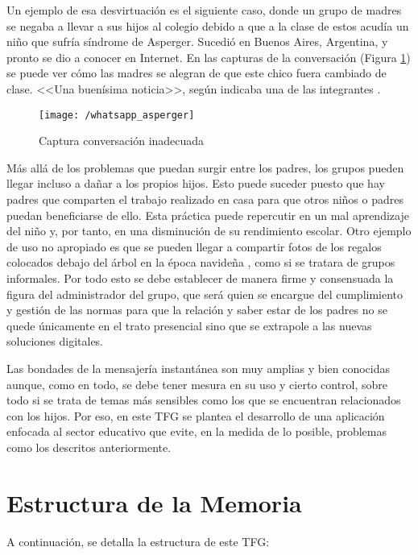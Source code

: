 \newpage

Un ejemplo de esa desvirtuación es el siguiente caso, donde un grupo de madres se negaba a llevar a sus hijos al colegio debido a que a la clase de estos acudía un niño que sufría síndrome de Asperger. Sucedió en Buenos Aires, Argentina, y pronto se dio a conocer en Internet.
En las capturas de la conversación (Figura \ref{fig:whatasper}) se puede ver cómo las madres se alegran de que este chico fuera cambiado de clase. <<Una buenísima noticia>>, según indicaba una de las integrantes \cite{Vanguardia2017}.

\begin{figure}[!h]
	\begin{center}
		\texttt{[image: /whatsapp\_asperger]}
		\caption{Captura conversación inadecuada}
		\label{fig:whatasper}
	\end{center}
\end{figure}

Más allá de los problemas que puedan surgir entre los padres, los grupos pueden llegar incluso a dañar a los propios hijos. Esto puede suceder puesto que hay padres que comparten el trabajo realizado en casa para que otros niños o padres puedan beneficiarse de ello. Esta práctica puede repercutir en un mal aprendizaje del niño y, por tanto, en una disminución de su rendimiento escolar. Otro ejemplo de uso no apropiado es que se pueden llegar a compartir fotos de los regalos colocados debajo del árbol en la época navideña \cite{Alias2017}, como si se tratara de grupos informales. Por todo esto se debe establecer de manera firme y consensuada la figura del administrador del grupo, que será quien se encargue del cumplimiento y gestión de las normas para que la relación y saber estar de los padres no se quede únicamente en el trato presencial sino que se extrapole a las nuevas soluciones digitales.

\newpage

Las bondades de la mensajería instantánea son muy amplias y bien conocidas aunque, como en todo, se debe tener mesura en su uso y cierto control, sobre todo si se trata de temas más sensibles como los que se encuentran relacionados con los hijos. Por eso, en este \acs{TFG} se plantea el desarrollo de una aplicación enfocada al sector educativo que evite, en la medida de lo posible, problemas como los descritos anteriormente.

\section{Estructura de la Memoria}
A continuación, se detalla la estructura de este \acs{TFG}:

